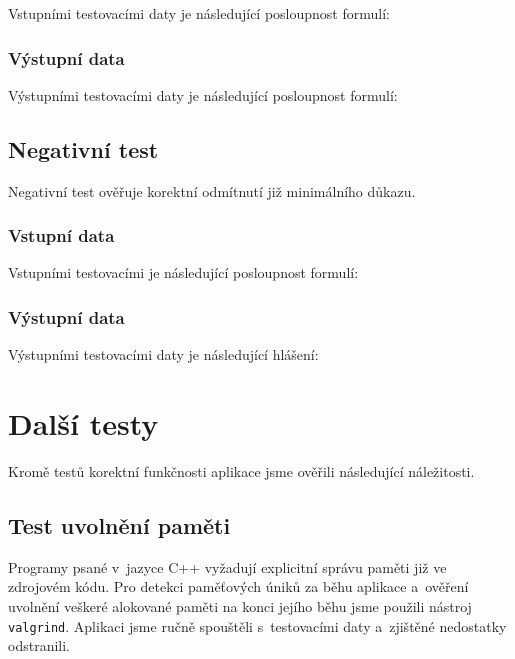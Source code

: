 \documentclass[thesis=B,czech,hidelinks]{thesis}[2012/06/26]
\begin{document}
Vstupními testovacími daty je následující posloupnost formulí:


\subsubsection{Výstupní data}

Výstupními testovacími daty je následující posloupnost formulí:


\subsection{Negativní test}

Negativní test ověřuje korektní odmítnutí již minimálního důkazu.

\subsubsection{Vstupní data}

Vstupními testovacími je následující posloupnost formulí:


\subsubsection{Výstupní data}

Výstupními testovacími daty je následující hlášení:


\section{Další testy}

Kromě testů korektní funkčnosti aplikace jsme ověřili následující náležitosti.

\subsection{Test uvolnění paměti}

Programy psané v~jazyce C++ vyžadují explicitní správu paměti již ve zdrojovém kódu. Pro detekci paměťových úniků za běhu aplikace a~ověření uvolnění veškeré alokované paměti na konci jejího běhu jsme použili nástroj \texttt{valgrind}. Aplikaci jsme ručně spouštěli s~testovacími daty a~zjištěné nedostatky odstranili.
\end{document}
